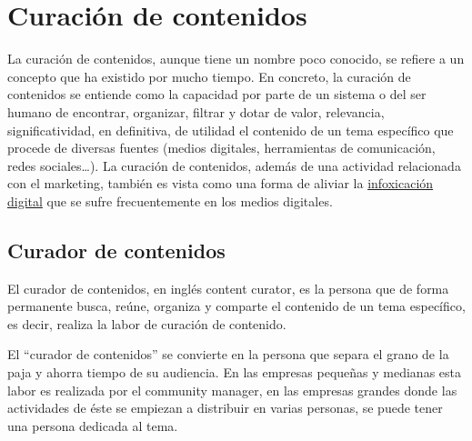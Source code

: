 \section{Curación de contenidos}

La curación de contenidos, aunque tiene un nombre poco conocido, se refiere a un concepto que ha existido por mucho tiempo. En concreto, la curación de contenidos se entiende como la capacidad por parte de un sistema o del ser humano de encontrar, organizar, filtrar y dotar de valor, relevancia, significatividad, en definitiva, de utilidad el contenido de un tema específico que procede de diversas fuentes (medios digitales, herramientas de comunicación, redes sociales…). La curación de contenidos, además de una actividad relacionada con el marketing, también es vista como una forma de aliviar la \href{https://www.webempresa.com/blog/que-es-infoxicacion.html}{infoxicación digital} que se sufre frecuentemente en los medios digitales.

\subsection{Curador de contenidos}

El curador de contenidos, en inglés content curator, es la persona que de forma permanente busca, reúne, organiza y comparte el contenido de un tema específico, es decir, realiza la labor de curación de contenido. 

El “curador de contenidos” se convierte en la persona que separa el grano de la paja y ahorra tiempo de su audiencia. En las empresas pequeñas y medianas esta labor es realizada por el community manager, en las empresas grandes donde las actividades de éste se empiezan a distribuir en varias personas, se puede tener una persona dedicada al tema.

